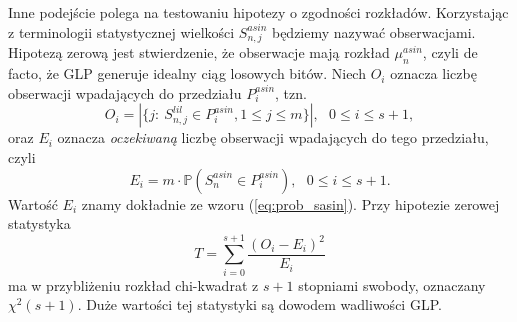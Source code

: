 \documentclass[a4paper,11pt,twoside]{book}
\newcommand{\Pro}[1]{\mathbb{P}\left(#1\right)}
\newcommand{\Slil}[1]{S^{lil}_#1}
\newcommand{\Sasin}[1]{S^{asin}_#1}
\theoremstyle{definition}
\begin{document}
Inne podejście polega na testowaniu hipotezy o zgodności rozkładów. Korzystając z terminologii statystycznej wielkości $\Sasin{{n,j}}$ będziemy nazywać obserwacjami. Hipotezą zerową jest stwierdzenie, że obserwacje mają rozkład $\mu^{asin}_n$, czyli de facto, że GLP generuje idealny ciąg losowych bitów. Niech $O_i$ oznacza liczbę obserwacji wpadających do przedziału $P^{asin}_i$, tzn.
\begin{equation}
 O_i = |\{ j:\ \Slil{{n,j}} \in  P^{asin}_i, 1 \leq j \leq m\}|,\ \ \ 0 \leq i \leq s+1,
\end{equation}
oraz $E_i$ oznacza \textit{oczekiwaną} liczbę obserwacji wpadających do tego przedziału, czyli
\begin{equation}
 E_i = m \cdot \Pro{\Sasin{n} \in P^{asin}_i},\ \ \ 0 \leq i \leq s+1.
\end{equation}
Wartość $E_i$ znamy dokładnie ze wzoru (\ref{eq:prob_sasin}). Przy hipotezie zerowej statystyka
\begin{equation}
 T = \sum_{i=0}^{s+1} \frac{(O_i - E_i)^2}{E_i}
\end{equation}
ma w przybliżeniu rozkład chi-kwadrat z $s+1$ stopniami swobody, oznaczany $\chi^2(s+1)$. Duże wartości tej statystyki są dowodem wadliwości GLP.
\end{document}
